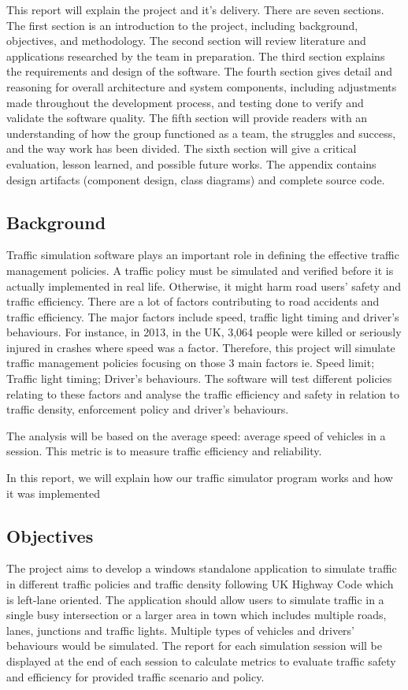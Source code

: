 \documentclass[11pt]{article}
\begin{document}
This report will explain the project and it's delivery. There are seven sections. The first section is an introduction to the project, including background, objectives, and methodology. The second section will review literature and applications researched by the team in preparation. The third section explains the requirements and design of the software. The fourth section gives detail and reasoning for overall architecture and system components, including adjustments made throughout the development process, and testing done to verify and validate the software quality. The fifth section will provide readers with an understanding of how the group functioned as a team, the struggles and success, and the way work has been divided. The sixth section will give a critical evaluation, lesson learned, and possible future works. The appendix contains design artifacts (component design, class diagrams) and complete source code.

\subsection{Background}
Traffic simulation software plays an important role in defining the effective traffic management policies. A traffic policy must be simulated and verified before it is actually implemented in real life. Otherwise, it might harm road users’ safety and traffic efficiency. There are a lot of factors contributing to road accidents and traffic efficiency. The major factors include speed, traffic light timing and driver’s behaviours. For instance, in 2013, in the UK, 3,064 people were killed or seriously injured in crashes where speed was a factor.
Therefore, this project will simulate traffic management policies focusing on those 3 main factors ie. Speed limit; Traffic light timing; Driver's behaviours. The software will test different policies relating to these factors and analyse the traffic efficiency and safety in relation to traffic density, enforcement policy and driver's behaviours.

The analysis will be based on the average speed: average speed of vehicles in a session. This metric is to measure traffic efficiency and reliability.

In this report, we will explain how our traffic simulator program works and how it was implemented
	


\subsection{Objectives}
The project aims to develop a windows standalone application to simulate traffic in different traffic policies and traffic density following UK Highway Code which is left-lane oriented. The application should allow users to simulate traffic in a single busy intersection or a larger area in town which includes multiple roads, lanes, junctions and traffic lights. Multiple types of vehicles and drivers' behaviours would be simulated. The report for each simulation session will be displayed at the end of each session to calculate metrics to evaluate traffic safety and efficiency for provided traffic scenario and policy.
\end{document}
